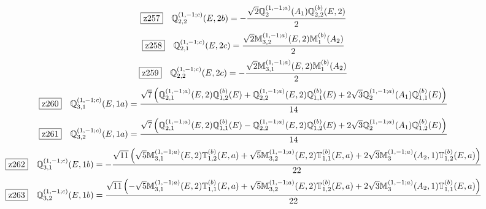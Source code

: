 \documentclass[fleqn,10pt,landscape]{jsarticle}
\begin{document}
\begin{dmath*}
\hspace*{3mm}\fbox{z257}\quad \mathbb{Q}_{2,2}^{(1,-1;c)}(E,2b)=- \frac{\sqrt{2} \mathbb{Q}_{2}^{(1,-1;a)}(A_{1}) \mathbb{Q}_{2,2}^{(b)}(E,2)}{2}
\end{dmath*}
\begin{dmath*}
\hspace*{3mm}\fbox{z258}\quad \mathbb{Q}_{2,1}^{(1,-1;c)}(E,2c)=\frac{\sqrt{2} \mathbb{M}_{3,2}^{(1,-1;a)}(E,2) \mathbb{M}_{1}^{(b)}(A_{2})}{2}
\end{dmath*}
\begin{dmath*}
\hspace*{3mm}\fbox{z259}\quad \mathbb{Q}_{2,2}^{(1,-1;c)}(E,2c)=- \frac{\sqrt{2} \mathbb{M}_{3,1}^{(1,-1;a)}(E,2) \mathbb{M}_{1}^{(b)}(A_{2})}{2}
\end{dmath*}
\begin{dmath*}
\hspace*{3mm}\fbox{z260}\quad \mathbb{Q}_{3,1}^{(1,-1;c)}(E,1a)=\frac{\sqrt{7} \left(\mathbb{Q}_{2,1}^{(1,-1;a)}(E,2) \mathbb{Q}_{1,2}^{(b)}(E) + \mathbb{Q}_{2,2}^{(1,-1;a)}(E,2) \mathbb{Q}_{1,1}^{(b)}(E) + 2 \sqrt{3} \mathbb{Q}_{2}^{(1,-1;a)}(A_{1}) \mathbb{Q}_{1,1}^{(b)}(E)\right)}{14}
\end{dmath*}
\begin{dmath*}
\hspace*{3mm}\fbox{z261}\quad \mathbb{Q}_{3,2}^{(1,-1;c)}(E,1a)=\frac{\sqrt{7} \left(\mathbb{Q}_{2,1}^{(1,-1;a)}(E,2) \mathbb{Q}_{1,1}^{(b)}(E) - \mathbb{Q}_{2,2}^{(1,-1;a)}(E,2) \mathbb{Q}_{1,2}^{(b)}(E) + 2 \sqrt{3} \mathbb{Q}_{2}^{(1,-1;a)}(A_{1}) \mathbb{Q}_{1,2}^{(b)}(E)\right)}{14}
\end{dmath*}
\begin{dmath*}
\hspace*{3mm}\fbox{z262}\quad \mathbb{Q}_{3,1}^{(1,-1;c)}(E,1b)=- \frac{\sqrt{11} \left(\sqrt{5} \mathbb{M}_{3,1}^{(1,-1;a)}(E,2) \mathbb{T}_{1,2}^{(b)}(E,a) + \sqrt{5} \mathbb{M}_{3,2}^{(1,-1;a)}(E,2) \mathbb{T}_{1,1}^{(b)}(E,a) + 2 \sqrt{3} \mathbb{M}_{3}^{(1,-1;a)}(A_{2},1) \mathbb{T}_{1,2}^{(b)}(E,a)\right)}{22}
\end{dmath*}
\begin{dmath*}
\hspace*{3mm}\fbox{z263}\quad \mathbb{Q}_{3,2}^{(1,-1;c)}(E,1b)=\frac{\sqrt{11} \left(- \sqrt{5} \mathbb{M}_{3,1}^{(1,-1;a)}(E,2) \mathbb{T}_{1,1}^{(b)}(E,a) + \sqrt{5} \mathbb{M}_{3,2}^{(1,-1;a)}(E,2) \mathbb{T}_{1,2}^{(b)}(E,a) + 2 \sqrt{3} \mathbb{M}_{3}^{(1,-1;a)}(A_{2},1) \mathbb{T}_{1,1}^{(b)}(E,a)\right)}{22}
\end{dmath*}
\end{document}
